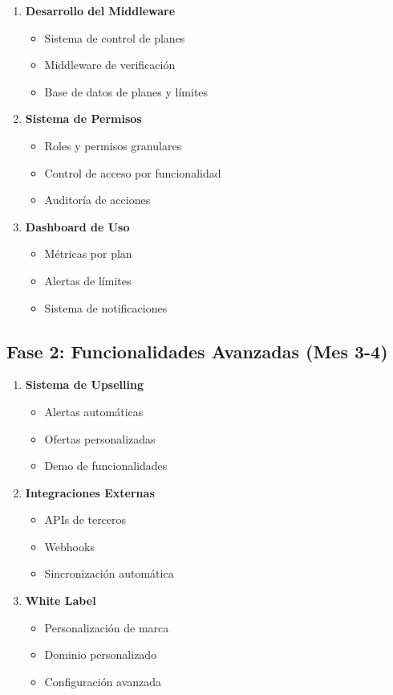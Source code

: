\documentclass[12pt,a4paper]{article}
\begin{document}
\begin{enumerate}
    \item \textbf{Desarrollo del Middleware}
    \begin{itemize}
        \item Sistema de control de planes
        \item Middleware de verificación
        \item Base de datos de planes y límites
    \end{itemize}
    
    \item \textbf{Sistema de Permisos}
    \begin{itemize}
        \item Roles y permisos granulares
        \item Control de acceso por funcionalidad
        \item Auditoría de acciones
    \end{itemize}
    
    \item \textbf{Dashboard de Uso}
    \begin{itemize}
        \item Métricas por plan
        \item Alertas de límites
        \item Sistema de notificaciones
    \end{itemize}
\end{enumerate}

\subsection{Fase 2: Funcionalidades Avanzadas (Mes 3-4)}

\begin{enumerate}
    \item \textbf{Sistema de Upselling}
    \begin{itemize}
        \item Alertas automáticas
        \item Ofertas personalizadas
        \item Demo de funcionalidades
    \end{itemize}
    
    \item \textbf{Integraciones Externas}
    \begin{itemize}
        \item APIs de terceros
        \item Webhooks
        \item Sincronización automática
    \end{itemize}
    
    \item \textbf{White Label}
    \begin{itemize}
        \item Personalización de marca
        \item Dominio personalizado
        \item Configuración avanzada
    \end{itemize}
\end{enumerate}
\end{document}
